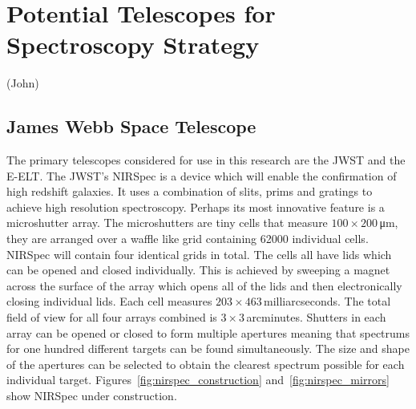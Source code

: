 \section{Potential Telescopes for Spectroscopy Strategy} %
	\label{sub:candidate_telescopes}
	(John)

		\subsection{James Webb Space Telescope} %
		\label{ssub:james_webb_space_telescope}
			The primary telescopes considered for use in this research are the JWST and the E-ELT. The JWST's NIRSpec is a device which will enable the confirmation of high redshift galaxies. It uses a combination of slits, prims and gratings to achieve high resolution spectroscopy. Perhaps its most innovative feature is a microshutter array. The microshutters are tiny cells that measure $100 \times 200$\,\si{\micro\metre}, they are arranged over a waffle like grid containing \num{62000} individual cells. NIRSpec will contain four identical grids in total. The cells all have lids which can be opened and closed individually. This is achieved by sweeping a magnet across the surface of the array which opens all of the lids and then electronically closing individual lids. Each cell measures $203 \times 463$\,milliarcseconds. The total field of view for all four arrays combined is $3 \times 3$\,arcminutes. Shutters in each array can be opened or closed to form multiple apertures meaning that spectrums for one hundred different targets can be found simultaneously. The size and shape of the apertures can be selected to obtain the clearest spectrum possible for each individual target. Figures~\ref{fig:nirspec_construction} and~\ref{fig:nirspec_mirrors} show NIRSpec under construction\cite{NIRSpec}\cite{JWSTinformation}.
